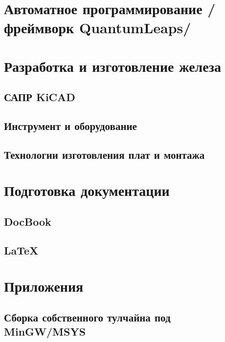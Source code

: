 \part{Автоматное программирование /фреймворк QuantumLeaps/}

\part{Разработка и изготовление железа}
\chapter{САПР KiCAD}
\chapter{Инструмент и оборудование}
\chapter{Технологии изготовления плат и монтажа}

\part{Подготовка документации}
\chapter{DocBook}
\chapter{\LaTeX}

\part{Приложения}
\chapter{Сборка собственного тулчайна под MinGW/MSYS}






